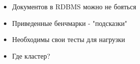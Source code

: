 \documentclass[usenames,dvipsnames, 18pt, compress, aspectratio=169]{beamer}
\begin{document}



\begin{frame}[fragile]
    \frametitle{}
    \vspace{10pt}
    \begin{itemize}[leftmargin=*, label={\MVRightarrow}]
        \item <+-> Документов в RDBMS можно не бояться
        \item <+-> Приведенные бенчмарки - "подсказки"
        \item <+-> Необходимы свои тесты для нагрузки
        \item <+-> Где кластер?
    \end{itemize}
\end{frame}

\end{document}

